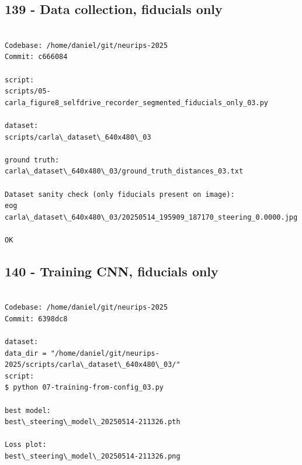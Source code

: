 \subsection{139 - Data collection, fiducials only}
\label{app_res:139}
\begin{verbatim}

Codebase: /home/daniel/git/neurips-2025
Commit: c666084

script:
scripts/05-carla_figure8_selfdrive_recorder_segmented_fiducials_only_03.py

dataset:
scripts/carla\_dataset\_640x480\_03

ground truth:
carla\_dataset\_640x480\_03/ground_truth_distances_03.txt

Dataset sanity check (only fiducials present on image):
eog carla\_dataset\_640x480\_03/20250514_195909_187170_steering_0.0000.jpg

OK

\end{verbatim}

\subsection{140 - Training CNN, fiducials only}
\label{app_res:140}

\begin{verbatim}

Codebase: /home/daniel/git/neurips-2025
Commit: 6398dc8

dataset:
data_dir = "/home/daniel/git/neurips-2025/scripts/carla\_dataset\_640x480\_03/" 
script:
$ python 07-training-from-config_03.py

best model:
best\_steering\_model\_20250514-211326.pth

Loss plot:
best\_steering\_model\_20250514-211326.png

\end{verbatim}

